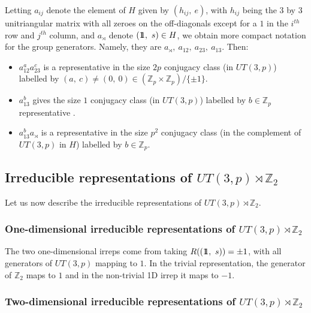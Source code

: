 \documentclass[12pt]{article}
\theoremstyle{definition}
\def\identity{{\rlap{1} \hskip 1.6pt \hbox{1}}}
\begin{document}
Letting $a_{ij}$ denote the element of $H$ given by $(h_{ij},~e)$, with $h_{ij}$ being the 3 by 3 unitriangular matrix with all zeroes on the off-diagonals except for a $1$ in the $i^{th}$ row and $j^{th}$ column, and $a_{\rtimes}$ denote $(\identity,~s) \in H$, we obtain more compact notation for the group generators. Namely, they are $a_{\rtimes},~a_{12},~a_{23},~a_{13}$. Then:
\begin{itemize}
\item
 $a_{12}^a a_{23}^c$ is a representative in the size $2p$ conjugacy class (in $UT(3,p)$) labelled by $(a,~c) \neq (0,~0) \in (\mathbb{Z}_p \times \mathbb{Z}_p)/\{\pm 1\}$.
\item
$a_{13}^b$ gives the size $1$ conjugacy class (in $UT(3,p)$) labelled by $b \in \mathbb{Z}_p$
representative .
\item
$a_{13}^ba_{\rtimes}$ is a representative in the size $p^2$ conjugacy class (in the complement of $UT(3,p)$ in $H$) labelled by $b \in \mathbb{Z}_p$.
\end{itemize}

\subsection{Irreducible representations of $UT(3,p) \rtimes \mathbb{Z}_2$}

Let us now describe the irreducible representations of $UT(3,p) \rtimes \mathbb{Z}_2$.

\subsubsection*{One-dimensional irreducible representations of $UT(3,p) \rtimes \mathbb{Z}_2$}

The two one-dimensional irreps come from taking $R((\identity,~s)) = \pm 1$, with all generators of $UT(3,p)$ mapping to $1$. In the trivial representation, the generator of $\mathbb{Z}_2$ maps to $1$ and in the non-trivial 1D irrep it maps to $-1$.

\subsubsection*{Two-dimensional irreducible representations of $UT(3,p) \rtimes \mathbb{Z}_2$}
\end{document}
